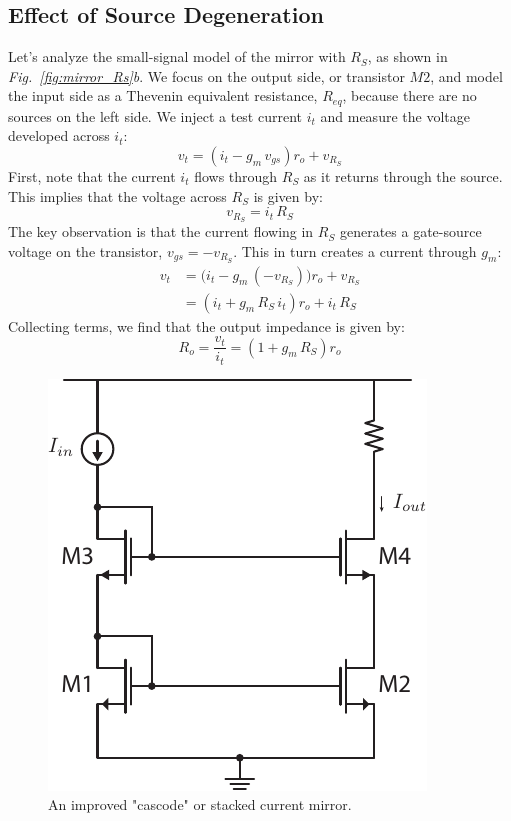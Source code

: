 \subsection{Effect of Source Degeneration}
Let's analyze the small-signal model of the mirror with $R_S$, as shown in \emph{Fig.~\ref{fig:mirror_Rs}b}.  We focus on the output side, or transistor $M2$, and model the input side as a Thevenin equivalent resistance, $R_{eq}$, because there are no sources on the left side.  We inject a test current $i_t$ and measure the voltage developed across $i_t$:
    \begin{equation}
        v_t = (i_t - g_m\,v_{gs})r_o + v_{R_S}
    \end{equation}
First, note that the current $i_t$ flows through $R_S$ as it returns through the source.  This implies that the voltage across $R_S$ is given by:
    \begin{equation}
        v_{R_S} = i_t\,R_S
    \end{equation}
The key observation is that the current flowing in $R_S$ generates a gate-source voltage on the transistor, $v_{gs} = -v_{R_S}$.  This in turn creates a current through $g_m$:
    \begin{align}
        v_t &= \big(i_t - g_m\,(-v_{R_S})\big)r_o + v_{R_S}\\[0.25cm]
        &= (i_t + g_m\,R_S\,i_t)r_o + i_t\,R_S
    \end{align}
Collecting terms, we find that the output impedance is given by:
    \begin{equation}
        R_o = \frac{v_t}{i_t} = \left(1 + g_m\,R_S\right)r_o
    \end{equation}
\newpage
\begin{figure}[t]
\centering
\includegraphics[scale=1]{12mirror_cascode.pdf}
\caption{An improved "cascode" or stacked current mirror.}
\label{fig:mirror_cascode}
\end{figure}
